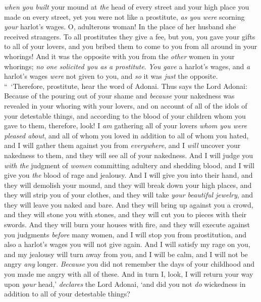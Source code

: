 \begin{biblechapter}
\verse \textit{when you built} your mound at \textit{the} head of every street and your high place you made on every street, yet you were not like a prostitute, \textit{as you were} scorning \textit{your} harlot’s wages.
\verse O, adulterous woman! In the place of her husband she received strangers.
\verse To all prostitutes they give a fee, but you, you gave your gifts to all of your lovers, and you bribed them to come to you from all around in your whorings!
\verse And it was the opposite with you from the \textit{other} women in your whorings; \textit{no one solicited you as a prostitute}. \textit{You gave} a harlot’s wages, and \textit{a} harlot’s wages \textit{were} not given to you, and \textit{so} it was \textit{just} the opposite.
\verse “ ‘Therefore, prostitute, hear the word of Adonai.
\verse Thus says the Lord Adonai: Because of the pouring out of your shame and \textit{because} your nakedness was revealed in your whoring with your lovers, and on account of all of the idols of your detestable things, and according to the blood of your children whom you gave to them,
\verse therefore, look! I \textit{am} gathering all of your lovers \textit{whom you were pleased about}, and all of whom you loved in addition to all of whom you hated, and I will gather them against you from \textit{everywhere}, and I \textit{will} uncover your nakedness to them, and they will see all of your nakedness.
\verse And I will judge you \textit{with the} judgment of \textit{women} committing adultery and shedding blood, and I will give you \textit{the} blood of rage and jealousy.
\verse And I will give you into their hand, and they will demolish your mound, and they will break down your high places, and they will strip you of your clothes, and they will take \textit{your beautiful jewelry}, and they will leave you naked and bare.
\verse And they will bring up against you a crowd, and they will stone you with stones, and they will cut you to pieces with their swords.
\verse And they will burn your houses with fire, and they will execute against you judgments \textit{before} many women, and I will stop you from prostitution, and also a harlot’s wages you will not give again.
\verse And I will satisfy my rage on you, and my jealousy will turn away from you, and I will be calm, and I will not be angry \textit{any} longer.
\verse \textit{Because} you did not remember the days of your childhood and you made me angry with all of these. And in turn I, look, I will return your way upon \textit{your} head,’ \textit{declares} the Lord Adonai, ‘and did you not \textit{do} wickedness in addition to all of your detestable things?

\end{biblechapter}
